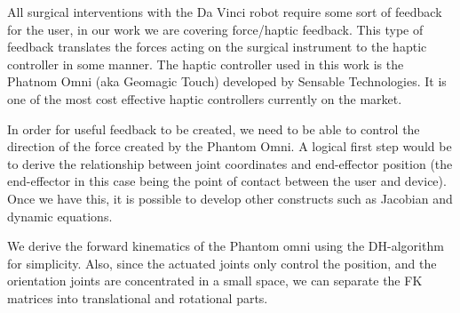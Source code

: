 	
\raggedbottom





\frontmatter




\tableofcontents*

\mainmatter 
{}




All surgical interventions with the Da Vinci robot require some sort of feedback for the user, in our work we are covering force/haptic feedback.
This type of feedback translates the forces acting on the surgical instrument to the haptic controller in some manner.
The haptic controller used in this work is the Phatnom Omni (aka Geomagic Touch) developed by Sensable Technologies.
It is one of the most cost effective haptic controllers currently on the market.

In order for useful feedback to be created, we need to be able to control the direction of the force created by the Phantom Omni.
A logical first step would be to derive the relationship between joint coordinates and end-effector position (the end-effector in this case being the point of contact between the user and device). 
Once we have this, it is possible to develop other constructs such as Jacobian and dynamic equations.

We derive the forward kinematics of the Phantom omni using the DH-algorithm for simplicity. Also, since the actuated joints only control the position, and the orientation joints are concentrated in a small space, we can separate the FK matrices into translational and rotational parts.

